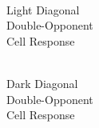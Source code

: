 \documentclass[journal,onecolumn]{IEEEtran}
\begin{document}
\begin{figure}[H]
\begin{subfigure}{0.15\textwidth}
        \caption{\\ Light Diagonal\\ Double-Opponent\\ Cell Response}
    \end{subfigure}
    \begin{subfigure}{0.15\textwidth}
        \centering
        \captionsetup{justification=centering}
        \caption{\\ Dark Diagonal\\ Double-Opponent\\ Cell Response}
    \end{subfigure}
    \begin{subfigure}{0.15\textwidth}
        \centering
        \captionsetup{justification=centering}

\end{subfigure}
\end{figure}
\end{document}
